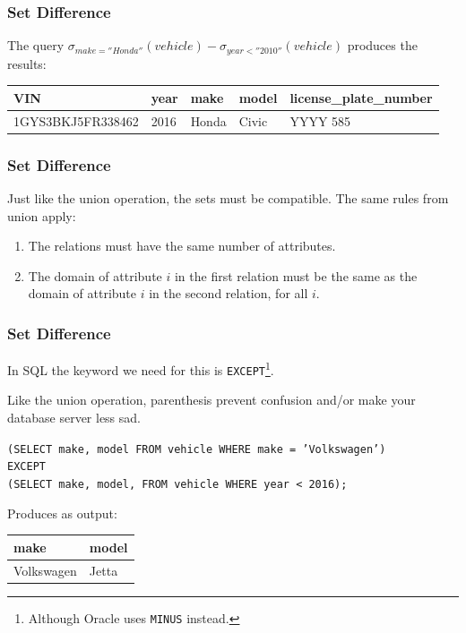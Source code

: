 \begin{frame}
\frametitle{Set Difference}

The query $\sigma_{make = ''Honda''}( vehicle ) -  \sigma_{year < ''2010''}( vehicle )$ produces the results: 

{\small
\begin{center}
\begin{tabular}{|l|l|l|l|l|} \hline
	\textbf{VIN} & \textbf{year} & \textbf{make} & \textbf{model} & \textbf{license\_plate\_number} \\ \hline
	1GYS3BKJ5FR338462 & 2016 & Honda & Civic & YYYY 585 \\ \hline	
\end{tabular}
\end{center}
}

\end{frame}



\begin{frame}
\frametitle{Set Difference}

Just like the union operation, the sets must be compatible. The same rules from union apply: 

\begin{enumerate}
	\item The relations must have the same number of attributes.
	\item The domain of attribute $i$ in the first relation must be the same as the domain of attribute $i$ in the second relation, for all $i$. 
\end{enumerate}

\end{frame}



\begin{frame}
\frametitle{Set Difference}

In SQL the keyword we need for this is \texttt{EXCEPT}\footnote{Although Oracle uses \texttt{MINUS} instead.}. 

Like the union operation, parenthesis prevent confusion and/or make your database server less sad.

\texttt{(SELECT make, model FROM vehicle WHERE make = 'Volkswagen')\\
EXCEPT\\
(SELECT make, model, FROM vehicle WHERE year < 2016);}

Produces as output: 

\begin{center}
\begin{tabular}{|l|l|} \hline
\textbf{make} & \textbf{model} \\ \hline
	Volkswagen & Jetta  \\ \hline
\end{tabular}
\end{center}

\end{frame}



